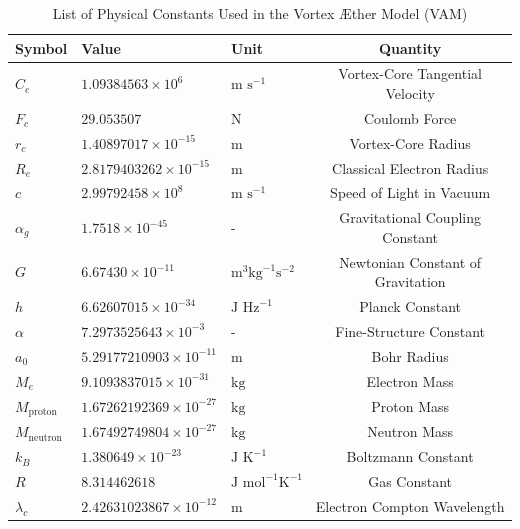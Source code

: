 \documentclass[a4paper,10pt]{article}
\renewcommand{\arraystretch}{1.5}
\begin{document}
    \begin{table}[htbp]
        \centering
        \renewcommand{\arraystretch}{1.0}
        \begin{tabular}{lllc}
            \toprule
            \textbf{Symbol} & \textbf{Value} & \textbf{Unit} & \textbf{Quantity} \\
            \midrule
            $C_e$ & $1.09384563 \times 10^6$ & $\text{m s}^{-1}$ & Vortex-Core Tangential Velocity \\
            $F_c$ & $29.053507$ & $\text{N}$ & Coulomb Force \\
            $r_c$ & $1.40897017 \times 10^{-15}$ & $\text{m}$ & Vortex-Core Radius \\
            $R_e$ & $2.8179403262 \times 10^{-15}$ & $\text{m}$ & Classical Electron Radius \\
            $c$ & $2.99792458 \times 10^8$ & $\text{m s}^{-1}$ & Speed of Light in Vacuum \\
            $\alpha_g$ & $1.7518 \times 10^{-45}$ & - & Gravitational Coupling Constant \\
            $G$ & $6.67430 \times 10^{-11}$ & $\text{m}^3 \text{kg}^{-1} \text{s}^{-2}$ & Newtonian Constant of Gravitation \\
            $h$ & $6.62607015 \times 10^{-34}$ & $\text{J Hz}^{-1}$ & Planck Constant \\
            $\alpha$ & $7.2973525643 \times 10^{-3}$ & - & Fine-Structure Constant \\
            $a_0$ & $5.29177210903 \times 10^{-11}$ & $\text{m}$ & Bohr Radius \\
            $M_e$ & $9.1093837015 \times 10^{-31}$ & $\text{kg}$ & Electron Mass \\
            $M_\text{proton}$ & $1.67262192369 \times 10^{-27}$ & $\text{kg}$ & Proton Mass \\
            $M_\text{neutron}$ & $1.67492749804 \times 10^{-27}$ & $\text{kg}$ & Neutron Mass \\
            $k_B$ & $1.380649 \times 10^{-23}$ & $\text{J K}^{-1}$ & Boltzmann Constant \\
            $R$ & $8.314462618$ & $\text{J mol}^{-1} \text{K}^{-1}$ & Gas Constant \\
            $\lambda_c$ & $2.42631023867 \times 10^{-12}$ & $\text{m}$ & Electron Compton Wavelength \\
            \bottomrule
        \end{tabular}
        \caption{List of Physical Constants Used in the Vortex Æther Model (VAM)}
        \label{tab:vam_constants}
    \end{table}
\end{document}
